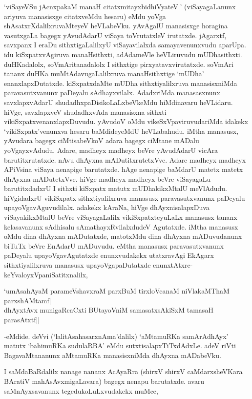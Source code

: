 `viSayeVSu jAcnxpakaM manaH citatxmitayxbidhiVyateV|' (viSayagaLanunx ariyuva manasisxge citatxveMdu hesaru) eMdu yoVga shAsatxrXdalilxruvaMteyeV heVLabeVku. yAvAgalU manasisxge horagina vasutxgaLa bagegx yAvudAdarU viSaya toVrutatxleV irutatxde. jAgarxtf, savxpanx I eraDu sithxtigaLalilxyU viSayavilalxda samayavenunxvudu aparUpa. idu kiSxpatxvAgiruva manaHsithxti, adAdameVle heVLiruvudu mUDhasithxti. duHKadalolx, soVmAritanadalolx I sithxtige pirxyatavxvirutatxde. soVmAri tananx duHKa muMtAdavugaLalilxruva manaHsithxtige `mUDha' enanxlapxDutatxde. kiSxpatxdaMte mUDha sithxtiyalilxruva manasisxniMda paravasutxvanunx paDeyalu sAdhayxvilalx. AdadxriMda manasasxnunx savxlapxvAdarU shudadhxpaDisikoLaLxbeVkeMdu hiMdinavaru heVLidaru. hiVge, savxlapxveV shudadhxvAda manasisxna sithxti vikiSxpatxvenanxlapxDuvudu. yAvudoV oMdu vikeSxVpaviruvudariMda idakekx `vikiSxpatx'venunxva hesaru baMdideyeMdU heVLabahudu. iMtha manasusx, yAvudara bagegx ciMtisabeVkoV adara bagegx ciMtane mADalu yoVgayxvAdudu. Adare, madheyx madheyx beVre yAvudAdarU vicAra barutitxrutatxde. nAvu dhAyxna mADutitxrutetxVve. Adare madheyx madheyx APiVsina viSaya nenapige barutatxde. hAge nenapige baMdarU matetx matetx dhAyxna mADutetxVve. hiVge madheyx madheyx beVre viSayagaLu barutitxdadxrU I sithxti kiSxpatx matutx mUDhakikxMtalU meVlAdudu. hiVgidadxrU vikiSxpatx sithxtiyalilxruva manasusx paravasutxvanunx paDeyalu upayoVgavAguvudilalx. adakekx kAraNa, hiVge dhAyxnisalapxDuva viSayakikxMtalU beVre viSayagaLalilx vikiSxpatxteyuLaLx manasusx tananx kelasavanunx sAdhisalu sAmathayxRvilalxdudeV Agutatxde. iMtha manasusx oMdu dina dhAyxna mADutatxde, matotxMdu dina dhAyxna mADuvudanunx biTuTx beVre EnAdarU mADuvudu. eMtha manasusx paravasutxvanunx paDeyalu upayoVgavAgutatxde enunxvudakekx utatxravAgi EkAgarx sithxtiyalilxruva manasusx upayoVgapaDutatxde enunxtAtxre-keYvaloyxVpaniSatitxnalilx,

\begin{shloka}
`umAsahAyaM parameVshavxraM parxBuM tirxloVcanaM niVlakaMThaM parxshAMtamf|\\
dhAyxtAvx munigaRcaCxti BUtayoVniM samasatxsAkiSxM tamasaH parasAtxtf||
\end{shloka}

-eMdide. deVvi (`lalitAsahasarxnAma'dalilx) `aMtamuRKa samArAdhAyx' matutx `bahimuRKa sudulaRBA' eMdu sutxtisalapxTiTxdAdxLe. adeV riVti BagavaMtananunx aMtamuRKa manasisxniMda dhAyxna mADabeVku.

I saMdaBaRdalilx nanage nananx AcAyaRra (shirxV shirxV caMdarxsheVKara BAratiV mahAsAvxmigaLavara) bagegx nenapu barutatxde. avaru saMnAyxsavanunx tegedukoLuLxvudakekx muMce,

